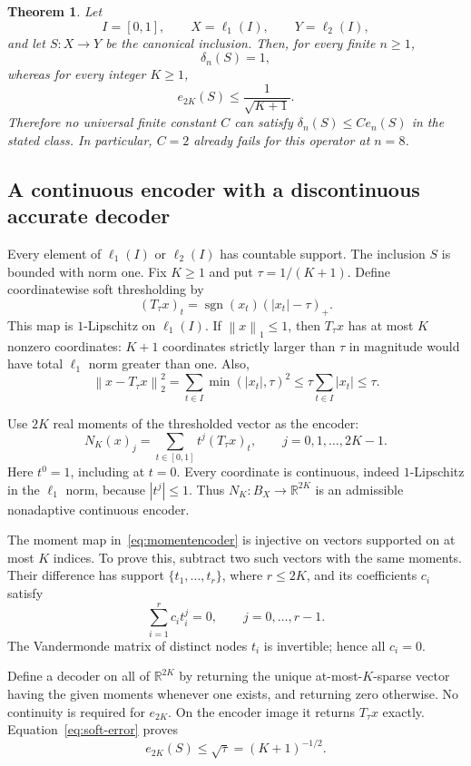 \documentclass[11pt,a4paper]{article}
\newtheorem{theorem}{Theorem}[section]
\theoremstyle{remark}
\newcommand{\R}{\mathbb R}
\newcommand{\norm}[1]{\left\lVert #1\right\rVert}
\newcommand{\sgn}{\operatorname{sgn}}
\begin{document}
\begin{theorem}\label{thm:decoder}
Let
\[
 I=[0,1],\qquad X=\ell_1(I),\qquad Y=\ell_2(I),
\]
and let $S:X\to Y$ be the canonical inclusion. Then, for every finite $n\ge1$,
\[
 \delta_n(S)=1,
\]
whereas for every integer $K\ge1$,
\[
 e_{2K}(S)\le\frac1{\sqrt{K+1}}.
\]
Therefore no universal finite constant $C$ can satisfy $\delta_n(S)\le Ce_n(S)$ in the stated class. In particular, $C=2$ already fails for this operator at $n=8$.
\end{theorem}

\subsection{A continuous encoder with a discontinuous accurate decoder}

Every element of $\ell_1(I)$ or $\ell_2(I)$ has countable support. The inclusion $S$ is bounded with norm one. Fix $K\ge1$ and put $\tau=1/(K+1)$. Define coordinatewise soft thresholding by
\[
 (T_\tau x)_t=\sgn(x_t)(|x_t|-\tau)_+.
\]
This map is $1$-Lipschitz on $\ell_1(I)$. If $\norm{x}_1\le1$, then $T_\tau x$ has at most $K$ nonzero coordinates: $K+1$ coordinates strictly larger than $\tau$ in magnitude would have total $\ell_1$ norm greater than one. Also,
\begin{equation}\label{eq:soft-error}
 \norm{x-T_\tau x}_2^2
 =\sum_{t\in I}\min(|x_t|,\tau)^2
 \le\tau\sum_{t\in I}|x_t|\le\tau.
\end{equation}

Use $2K$ real moments of the thresholded vector as the encoder:
\begin{equation}\label{eq:momentencoder}
 N_K(x)_j=\sum_{t\in[0,1]}t^j(T_\tau x)_t,
 \qquad j=0,1,\ldots,2K-1.
\end{equation}
Here $t^0=1$, including at $t=0$. Every coordinate is continuous, indeed $1$-Lipschitz in the $\ell_1$ norm, because $|t^j|\le1$. Thus $N_K:B_X\to\R^{2K}$ is an admissible nonadaptive continuous encoder.

The moment map in~\eqref{eq:momentencoder} is injective on vectors supported on at most $K$ indices. To prove this, subtract two such vectors with the same moments. Their difference has support $\{t_1,\ldots,t_r\}$, where $r\le2K$, and its coefficients $c_i$ satisfy
\[
 \sum_{i=1}^r c_i t_i^j=0,\qquad j=0,\ldots,r-1.
\]
The Vandermonde matrix of distinct nodes $t_i$ is invertible; hence all $c_i=0$.

Define a decoder on all of $\R^{2K}$ by returning the unique at-most-$K$-sparse vector having the given moments whenever one exists, and returning zero otherwise. No continuity is required for $e_{2K}$. On the encoder image it returns $T_\tau x$ exactly. Equation~\eqref{eq:soft-error} proves
\[
 e_{2K}(S)\le\sqrt\tau=(K+1)^{-1/2}.
\]
\end{document}
